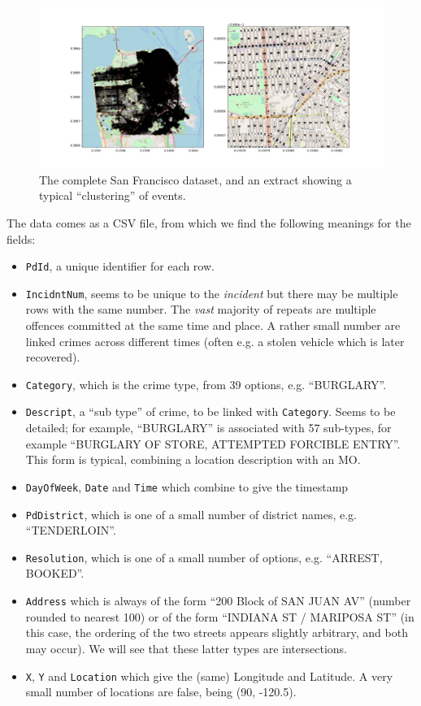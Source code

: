 \documentclass[twoside,a4paper,twocolumn,10pt]{article}
\theoremstyle{plain}
\theoremstyle{definition}
\begin{document}
\begin{figure}
  \includegraphics[width=\textwidth]{SF_overview.png}
  \caption{The complete San Francisco dataset, and an extract showing a typical ``clustering'' of events.}
  \label{fig:two}
\end{figure}

The data comes as a CSV file, from which we find the following meanings for the fields:
\begin{itemize}
\item \texttt{PdId}, a unique identifier for each row.
\item \texttt{IncidntNum}, seems to be unique to the \emph{incident} but there may be multiple
  rows with the same number.  The \emph{vast} majority of repeats are multiple offences committed at the same time
  and place.  A rather small number are linked crimes across different times (often e.g. a stolen vehicle
  which is later recovered).
\item \texttt{Category}, which is the crime type, from 39 options, e.g. ``BURGLARY''.
\item \texttt{Descript}, a ``sub type'' of crime, to be linked with \texttt{Category}.
  Seems to be detailed; for example, ``BURGLARY'' is associated with 57 sub-types, for example
  ``BURGLARY OF STORE, ATTEMPTED FORCIBLE ENTRY''.  This form is typical, combining a location
  description with an MO.
\item \texttt{DayOfWeek}, \texttt{Date} and \texttt{Time} which combine to give the timestamp
\item \texttt{PdDistrict}, which is one of a small number of district names, e.g. ``TENDERLOIN''.
\item \texttt{Resolution}, which is one of a small number of options, e.g. ``ARREST, BOOKED''.
\item \texttt{Address} which is always of the form ``200 Block of SAN JUAN AV'' (number rounded to
  nearest 100) or of the form ``INDIANA ST / MARIPOSA ST'' (in this case, the ordering of the
  two streets appears slightly arbitrary, and both may occur).  We will see that these latter types
  are intersections.
\item \texttt{X}, \texttt{Y} and \texttt{Location} which give the (same) Longitude and Latitude.
  A very small number of locations are false, being (90, -120.5).
\end{itemize}
\end{document}
